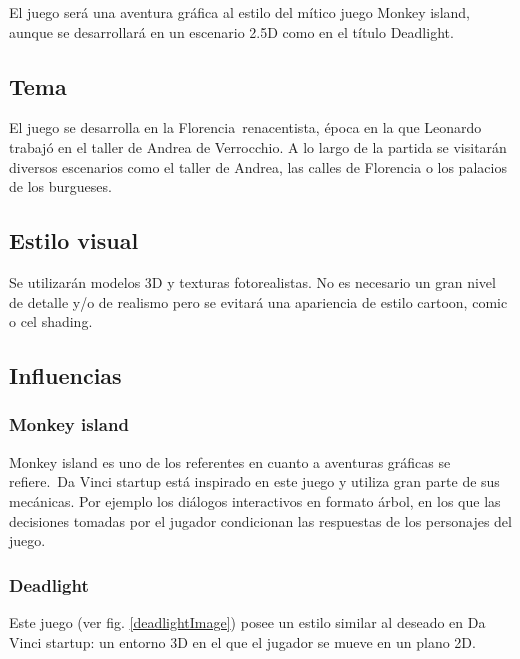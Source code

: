 {
El juego ser\'a una aventura gr\'afica al estilo del m\'itico juego Monkey island, aunque se desarrollar\'a en un
escenario 2.5D como en el t\'itulo Deadlight.}

\subsection[Tema]{ Tema}
\hypertarget{Toc484614210}{}{
El juego se desarrolla en la Florencia\ renacentista, \'epoca en la que Leonardo trabaj\'o en el taller de Andrea de
Verrocchio. A lo largo de la partida se visitar\'an diversos escenarios como el taller de Andrea, las calles de
Florencia o los palacios de los burgueses.}

\subsection[Estilo visual]{ Estilo visual}
\hypertarget{Toc484614211}{}{
Se utilizar\'an modelos 3D y texturas fotorealistas. No es necesario un gran nivel de detalle y/o de realismo pero se
evitar\'a una apariencia de estilo cartoon, comic o cel shading.}

\subsection[Influencias]{ Influencias}
\hypertarget{Toc484614212}{}\subsubsection[Monkey island]{ Monkey island}
\hypertarget{Toc484614213}{}{
Monkey island es uno de los referentes en cuanto a aventuras gr\'aficas se refiere.\ Da Vinci startup est\'a inspirado
en este juego y utiliza gran parte de sus mec\'anicas. Por ejemplo los di\'alogos interactivos en formato \'arbol, en
los que las decisiones tomadas por el jugador condicionan las respuestas de los personajes del juego.}

\subsubsection[Deadlight]{ Deadlight}
\hypertarget{Toc484614214}{}{
Este juego (ver fig. \ref{deadlightImage}) posee un estilo similar al deseado en Da Vinci startup: un entorno 3D en el que el jugador se mueve en un
plano 2D.}

